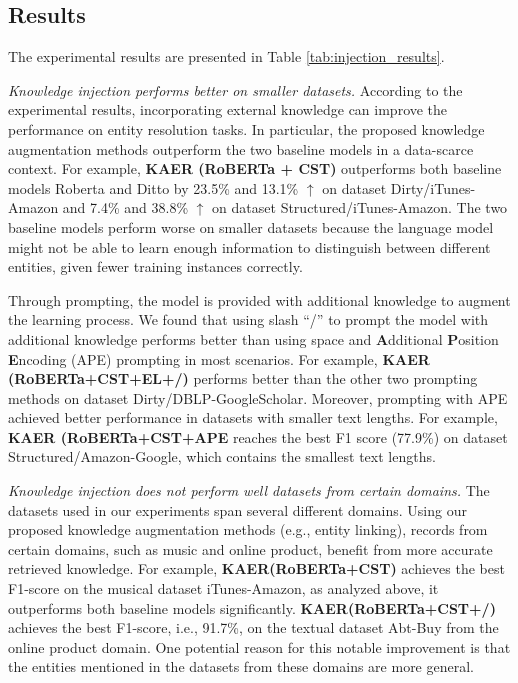 \subsection{Results}
The experimental results are presented in Table \ref{tab:injection_results}.


\textit{Knowledge injection performs better on smaller datasets.}
According to the experimental results, incorporating external knowledge can improve the performance on entity resolution tasks. In particular, the proposed knowledge augmentation methods outperform the two baseline models in a data-scarce context.
For example, \textbf{KAER (RoBERTa + CST)} outperforms both baseline models Roberta and Ditto by 23.5\% and 13.1\% $\uparrow$ on dataset Dirty/iTunes-Amazon and 7.4\% and 38.8\% $\uparrow$ on dataset Structured/iTunes-Amazon. The two baseline models perform worse on smaller datasets because the language model might not be able to learn enough information to distinguish between different entities, given fewer training instances correctly. 
 
Through prompting, the model is provided with additional knowledge to augment the learning process. We found that using slash ``/'' to prompt the model with additional knowledge performs better than using space and \textbf{A}dditional \textbf{P}osition \textbf{E}ncoding (APE) prompting in most scenarios. For example, \textbf{KAER (RoBERTa+CST+EL+/)} performs better than the other two prompting methods 
on dataset Dirty/DBLP-GoogleScholar. Moreover, prompting with APE achieved better performance in datasets with smaller text lengths. For example, \textbf{KAER (RoBERTa+CST+APE} reaches the best F1 score (77.9\%) on dataset Structured/Amazon-Google, which contains the smallest text lengths.  

\textit{Knowledge injection does not perform well datasets from certain domains.}
The datasets used in our experiments span several different domains. Using our proposed knowledge augmentation methods (e.g., entity linking), records from certain domains, such as music and online product, benefit from more accurate retrieved knowledge. For example, \textbf{KAER(RoBERTa+CST)} achieves the best F1-score on the musical dataset iTunes-Amazon, as analyzed above, it outperforms both baseline models significantly. \textbf{KAER(RoBERTa+CST+/)} achieves the best F1-score, i.e., 91.7\%, on the textual dataset Abt-Buy from the online product domain. One potential reason for this notable improvement is that the entities mentioned in the datasets from these domains are more general.

